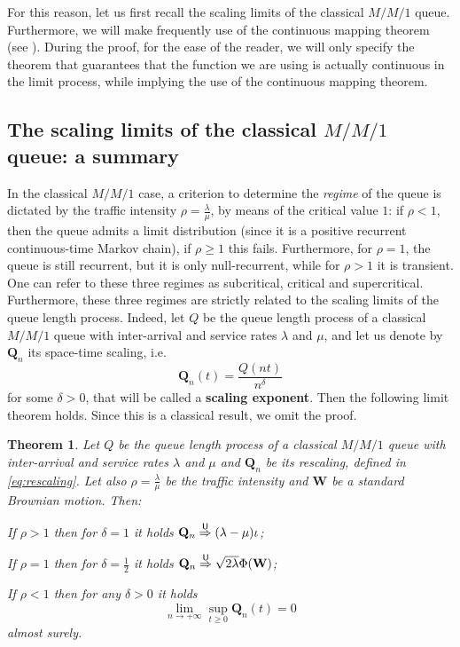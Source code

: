 \documentclass[]{amsart}
\numberwithin{equation}{section}
\newtheorem{thm}{Theorem}[section]
\theoremstyle{remark}
\theoremstyle{definition}
\begin{document}
For this reason, let us first recall the scaling limits of the classical $M/M/1$ queue. Furthermore, we will make frequently use of the continuous mapping theorem (see \cite[Theorem 3.4.4]{whitt2002stochastic}). During the proof, for the ease of the reader, we will only specify the theorem that guarantees that the function we are using is actually continuous in the limit process, while implying the use of the continuous mapping theorem. 

\subsection{The scaling limits of the classical $M/M/1$ queue: a summary}\label{sec:MM1}
In the classical $M/M/1$ case, a criterion to determine the \textit{regime} of the queue is dictated by the traffic intensity $\rho=\frac{\lambda}{\mu}$, by means of the critical value $1$: if $\rho<1$, then the queue admits a limit distribution (since it is a positive recurrent continuous-time Markov chain), if $\rho \ge 1$ this fails. Furthermore, for $\rho=1$, the queue is still recurrent, but it is only null-recurrent, while for $\rho>1$ it is transient. One can refer to these three regimes as subcritical, critical and supercritical. Furthermore, these three regimes are strictly related to the scaling limits of the queue length process. Indeed, let $Q$ be the queue length process of a classical $M/M/1$ queue with inter-arrival and service rates $\lambda$ and $\mu$, and let us denote by $\mathbf{Q}_n$ its space-time scaling, i.e.
\begin{equation}\label{eq:rescaling}
	\mathbf{Q}_n(t)=\frac{Q(nt)}{n^\delta}
\end{equation}
for some $\delta>0$, that will be called a \textbf{scaling exponent}. Then the following limit theorem holds. Since this is a classical result, we omit the proof.
\begin{thm}\label{thm:classscal}
	Let $Q$ be the queue length process of a classical $M/M/1$ queue with inter-arrival and service rates $\lambda$ and $\mu$ and $\mathbf{Q}_n$ be its rescaling, defined in \eqref{eq:rescaling}. Let also $\rho=\frac{\lambda}{\mu}$ be the traffic intensity and $\mathbf{W}$ be a standard Brownian motion. Then:
	\begin{itemize}
		\item[$(i)$] If $\rho>1$ then for $\delta=1$ it holds $\mathbf{Q}_n \overset{\sf U}{\Rightarrow} (\lambda-\mu)\iota$;
		\item[$(ii)$] If $\rho=1$ then for $\delta=\frac{1}{2}$ it holds $\mathbf{Q}_n \overset{\sf U}{\Rightarrow} \sqrt{2\lambda}\Phi(\mathbf{W})$;
		{\item[$(iii)$] If $\rho<1$ then for any $\delta>0$ it holds 
		\begin{equation*}
			\lim_{n \to +\infty}\sup_{t \ge 0}\mathbf{Q}_n(t)=0
			\end{equation*}
		almost surely.}
		\end{itemize}
\end{thm}
\end{document}

